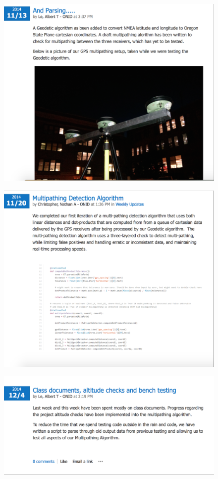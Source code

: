\documentclass[12pt]{article}
\begin{document}
\begin{figure}[H]
\centering
\includegraphics[scale=0.5]{blog_posts/2014_11_13.png}
\label{fig:my_label}
\end{figure}

\begin{figure}[H]
\centering
\includegraphics[scale=0.5]{blog_posts/2014_11_20.png}
\end{figure}

\begin{figure}[H]
\centering
\includegraphics[scale=0.5]{blog_posts/2014_12_4.png}
\label{fig:my_label}
\end{figure}
\end{document}

